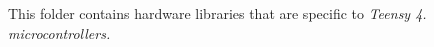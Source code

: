 This folder contains hardware libraries that are specific to {\itshape Teensy 4. microcontrollers.} 
